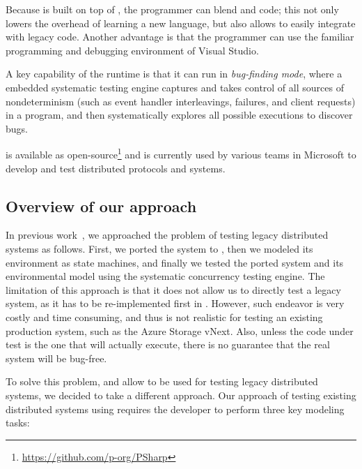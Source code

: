 Because \psharp is built on top of \csharp, the programmer can blend \psharp and \csharp code; this not only lowers the overhead of learning a new language, but also allows \psharp to easily integrate with legacy code. Another advantage is that the programmer can use the familiar programming and debugging environment of Visual Studio.

A key capability of the \psharp runtime is that it can run in \emph{bug-finding mode}, where a embedded systematic testing engine captures and takes control of all sources of nondeterminism (such as event handler interleavings, failures, and client requests) in a \psharp program, and then systematically explores all possible executions to discover bugs.

\psharp is available as open-source\footnote{\url{https://github.com/p-org/PSharp}} and is currently used by various teams in Microsoft to develop and test distributed protocols and systems.


\subsection{Overview of our approach}
\label{sec:method:model}

In previous work~\cite{deligiannis2015psharp}, we approached the problem of testing legacy distributed systems as follows. First, we ported the system to \psharp, then we modeled its environment as \psharp state machines, and finally we tested the ported system and its environmental model using the \psharp systematic concurrency testing engine. The limitation of this approach is that it does not allow us to directly test a legacy system, as it has to be re-implemented first in \psharp. However, such endeavor is very costly and time consuming, and thus is not realistic for testing an existing production system, such as the Azure Storage vNext. Also, unless the code under test is the one that will actually execute, there is no guarantee that the real system will be bug-free.

To solve this problem, and allow \psharp to be used for testing legacy distributed systems, we decided to take a different approach. Our approach of testing existing distributed systems using \psharp requires the developer to perform three key modeling tasks:

